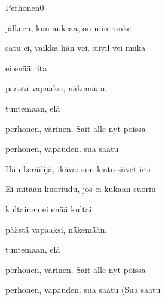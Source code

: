\documentclass[12pt,a4paper]{article}
\begin{document}
\thispagestyle{empty}
\begin{mysong}{Perhonen}{0}

\begin{SBVerse}
 jälkeen, kun  aukeaa, on  niin
 rauke

 satu ei, vaikka  hän vei. 
siivil vei muka

  ei  enää
 rita

 päästä vapaaksi,  näkemään,

 tuntemaan,  elä
\end{SBVerse}

\begin{SBChorus}
 perhonen,  värinen.
Sait  alle  nyt poissa 

 perhonen,  vapauden.
 sua saatu 
\end{SBChorus}


\begin{SBVerse}
Hän  keräilijä,  ikävä:  sun lento
 siivet irti 

Ei  mitään  kuoriudu, jos ei 
kukaan  suoriu

  kultainen ei  enää
 kultai

 päästä vapaaksi,  näkemään,

 tuntemaan,  elä
\end{SBVerse}

\begin{SBChorus}
 perhonen,  värinen.
Sait  alle  nyt poissa 

 perhonen,  vapauden.
 sua saatu  (Sua saatu
\end{SBChorus}


\end{mysong}
\end{document}
